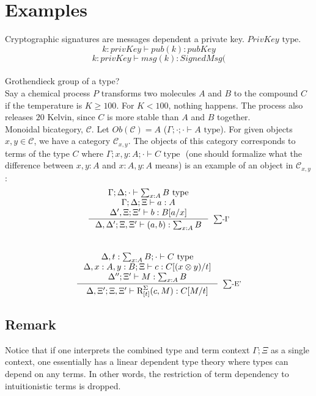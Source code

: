 \section*{Examples}
Cryptographic signatures are messages dependent a private key.
$PrivKey \text{ type}$.
\[
k : privKey \vdash pub(k) : pubKey
\]
\[
k : privKey \vdash msg(k) : SignedMsg(
\]
\\
Grothendieck group of a type?
\\
Say a chemical process $P$ transforms two molecules $A$ and $B$ to the compound $C$ if the temperature is $K \geq 100$. For $K < 100$, nothing happens. The process also releases $20$ Kelvin, since $C$ is more stable than $A$ and $B$ together.
\\
Monoidal bicategory, $\mathcal{C}$. Let $Ob(\mathcal{C}) = A$ ($\Gamma; \cdot ; \cdot \vdash A \text{ type}$). For given objects $x, y \in \mathcal{C}$, we have a category $\mathcal{C}_{x,y}$. The objects of this category corresponds to terms of the type $C$ where $\Gamma; x, y : A; \cdot \vdash C \text{ type }$ (one should formalize what the difference between $x, y : A$ and $x : A, y : A$ means) is an example of an object in $\mathcal{C}_{x, y}$:
\newpage
\[
\begin{split}
  \inference {
    \Gamma; \Delta; \cdot \vdash \sum_{x : A}B \text{ type}\\
    \Gamma; \Delta ; \Xi \vdash a : A\\
    \Delta', \Xi ; \Xi' \vdash b : B[a/x]\\
}
           {\Delta, \Delta'; \Xi, \Xi' \vdash (a, b) : \sum_{x : A}B}[$\sum$-I']
\end{split}
\]\\
\[
\begin{split}
\inference {\Delta, t: \sum_{x : A}B; \cdot \vdash C \text{ type}\\
  \Delta, x: A, y: B; \Xi \vdash c : C[(x \otimes y)/t]\\
    \Delta''; \Xi' \vdash M: \sum_{x : A}B\\
}
           {\Delta, \Xi'; \Xi, \Xi' \vdash \text{R}^{\Sigma}_{[t]}(c, M) : C[M/t]
           }[$\sum$-E']
\end{split}
\]
\subsection*{Remark}
Notice that if one interprets the combined type and term context $\Gamma; \Xi$ as a single context, one essentially has a linear dependent type theory where types can depend on any terms. In other words, the restriction of term dependency to intuitionistic terms is dropped.
